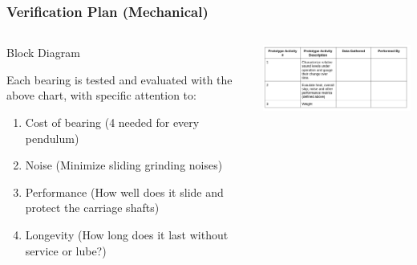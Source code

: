\documentclass[aspectratio=169]{beamer}
\begin{document}
\begin{frame}
    \frametitle{Verification Plan (Mechanical)}

    \begin{columns}
        \begin{column}{0.40\textwidth}
            \begin{block}{Block Diagram}
                \tiny{
                    Each bearing is tested and evaluated with the above chart, with specific attention to:
                    \begin{enumerate}
                        \item Cost of bearing (4 needed for every pendulum)
                        \item Noise (Minimize sliding grinding noises)
                        \item Performance (How well does it slide and protect the carriage shafts)
                        \item Longevity (How long does it last without service or lube?)
                    \end{enumerate}
                }
            \end{block}
        \end{column}

        \begin{column}{0.58\textwidth}
            \includegraphics[width=8.5cm]{MechanicalPrototype}
        \end{column}
    \end{columns}

\end{frame}
\end{document}
